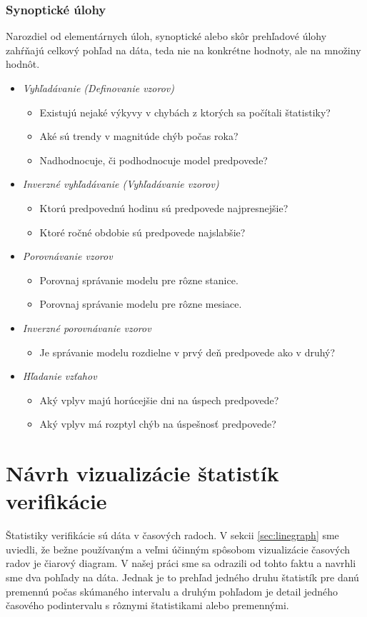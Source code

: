 \subsubsection{Synoptické úlohy}
Narozdiel od elementárnych úloh, synoptické alebo skôr prehľadové úlohy zahŕňajú celkový pohľad na dáta, teda nie na konkrétne hodnoty, ale na množiny hodnôt.
\begin{itemize}[noitemsep]
	\item \textit{Vyhľadávanie (Definovanie vzorov)}
	\begin{itemize}
		\item Existujú nejaké výkyvy v chybách z ktorých sa počítali štatistiky?
		\item Aké sú trendy v magnitúde chýb počas roka?
		\item Nadhodnocuje, či podhodnocuje model predpovede?
	\end{itemize}
	\item \textit{Inverzné vyhľadávanie (Vyhľadávanie vzorov)}
	\begin{itemize}
		\item Ktorú predpovednú hodinu sú predpovede najpresnejšie?
		\item Ktoré ročné obdobie sú predpovede najslabšie?
	\end{itemize}
	\item \textit{Porovnávanie vzorov}
	\begin{itemize}
		\item Porovnaj správanie modelu pre rôzne stanice.	
		\item Porovnaj správanie modelu pre rôzne mesiace.	
	\end{itemize}
	\item \textit{Inverzné porovnávanie vzorov}
	\begin{itemize}
		\item Je správanie modelu rozdielne v prvý deň predpovede ako v druhý?
	\end{itemize}
	\item \textit{Hľadanie vzťahov}
	\begin{itemize}
		\item Aký vplyv majú horúcejšie dni na úspech predpovede?
		\item Aký vplyv má rozptyl chýb na úspešnosť predpovede?
	\end{itemize}
\end{itemize}

\section{Návrh vizualizácie štatistík verifikácie} 
Štatistiky verifikácie sú dáta v časových radoch. V sekcii \ref{sec:linegraph} sme uviedli, že bežne používaným a veľmi účinným spôsobom vizualizácie časových radov je čiarový diagram. V našej práci sme sa odrazili od tohto faktu a navrhli sme dva pohľady na dáta. Jednak je to prehľad jedného druhu štatistík pre danú premennú počas skúmaného intervalu a druhým pohľadom je detail jedného časového podintervalu s rôznymi štatistikami alebo premennými.

